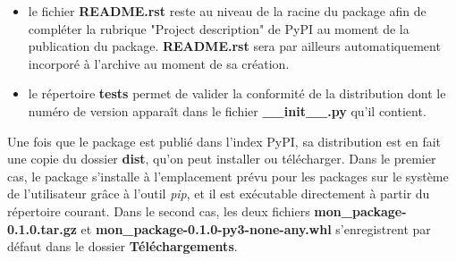 \documentclass[twoside,a4paper,11pt,frenchb,openany]{report}
\begin{document}
\begin{itemize}
\item le fichier \textbf{README.rst} reste au niveau de la racine du package afin de compléter la rubrique "Project description" de PyPI au moment de la publication du package. \textbf{README.rst} sera par ailleurs automatiquement incorporé à l'archive au moment de sa création.
\item le répertoire \textbf{tests} permet de valider la conformité de la distribution dont le numéro de version apparaît dans le fichier \textbf{\_\_init\_\_.py} qu'il contient.
\end{itemize}

Une fois que le package est publié dans l'index PyPI, sa distribution est en fait une copie du dossier \textbf{dist}, qu'on peut installer ou télécharger. Dans le premier cas, le package s'installe à l'emplacement prévu pour les packages sur le système de l'utilisateur grâce à l'outil \textit{pip}, et il est exécutable directement à partir du répertoire courant. Dans le second cas, les deux fichiers \textbf{mon\_package-0.1.0.tar.gz} et \textbf{mon\_package-0.1.0-py3-none-any.whl} s'enregistrent par défaut dans le dossier \textbf{Téléchargements}.
\end{document}
